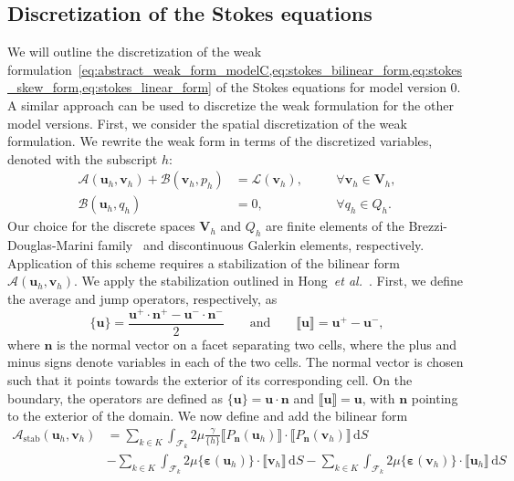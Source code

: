 \documentclass[fleqn]{wlscirep}
\newcommand{\intF}[1]{\int_{\mathcal{F}_k}#1 \, \mathrm dS}
\newcommand{\avg}[1]{\{#1\}}
\newcommand{\jump}[1]{\llbracket#1\rrbracket}
\newcommand{\nn}{\mathbf{n}}
\newcommand{\uu}{\mathbf{u}}
\newcommand{\vv}{\mathbf{v}}
\newcommand{\VV}{\mathbf{V}}
\newcommand{\beps}{\bm{\varepsilon}}
\begin{document}
\subsection{Discretization of the Stokes equations}
We will outline the discretization of the weak formulation~\cref{eq:abstract_weak_form_modelC,eq:stokes_bilinear_form,eq:stokes_skew_form,eq:stokes_linear_form} of the Stokes equations for model version 0. A similar approach can be used to discretize the weak formulation for the other model versions. First, we consider the spatial discretization of the weak formulation. We rewrite the weak form in terms of the discretized variables, denoted with the subscript $h$:
\begin{subequations}
    \begin{alignat}{2}
        \mathcal{A}(\uu_h, \vv_h) + \mathcal{B}(\vv_h, p_h) &= \mathcal{L}(\vv_h), &&\quad\forall\vv_h\in\VV_h, \\
        \mathcal{B}(\uu_h, q_h) &= 0, &&\quad\forall q_h\in Q_h.
    \end{alignat}%
    \label{eq:no_stabilization_abstract_discrete_weak_form_modelC}%
\end{subequations}%
Our choice for the discrete spaces $\VV_h$ and $Q_h$ are finite elements of the Brezzi-Douglas-Marini family~\cite{Brezzi1985TwoProblems} and discontinuous Galerkin elements, respectively. Application of this scheme requires a stabilization of the bilinear form $\mathcal{A}(\uu_h, \vv_h)$. We apply the stabilization outlined in Hong~\emph{et al.}~\cite{Hong2016AEquations}. First, we define the average and jump operators, respectively, as
\begin{equation*}
    \avg{\uu} = \frac{\uu^+\cdot\nn^+ - \uu^-\cdot\nn^-}{2} \qquad\mathrm{and}\qquad \jump{\uu} = \uu^+ - \uu^-,
\end{equation*}
where $\nn$ is the normal vector on a facet separating two cells, where the plus and minus signs denote variables in each of the two cells. The normal vector is chosen such that it points towards the exterior of its corresponding cell. On the boundary, the operators are defined as $\avg{\uu} = \uu\cdot\nn$ and $\jump{\uu} = \uu$,
with $\nn$ pointing to the exterior of the domain. We now define and add the bilinear form
\begin{align*}
    \mathcal{A}_{\mathrm{stab}}(\uu_h, \vv_h) &= \sum_{k\in K}\intF{2\mu\frac{\gamma}{\avg{h}}\jump{P_{\nn}(\uu_h)}\cdot \jump{P_{\nn}(\vv_h)}}\\
    &-\sum_{k\in K}\intF{2\mu\avg{\beps(\uu_h)}\cdot\jump{\vv_h}}-\sum_{k\in K}\intF{2\mu\avg{\beps(\vv_h)}\cdot\jump{\uu_h}}
\end{align*}
\end{document}

